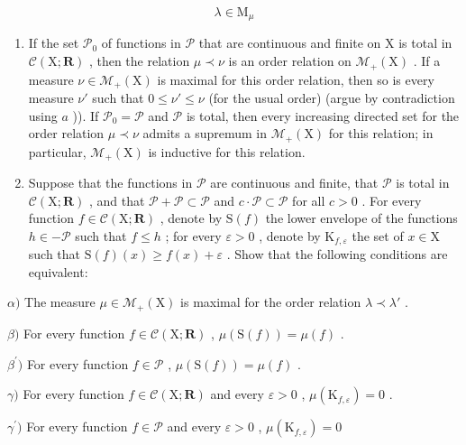 \[
\lambda \in \mathrm{M} _ {\mu}
\]

\begin{enumerate}
\def\labelenumi{\alph{enumi})}
\setcounter{enumi}{2}
\item
  If the set \(\mathcal{P}_0\) of functions in \(\mathcal{P}\) that are continuous and finite on X is total in \(\mathcal{C}(\mathrm{X};\mathbf{R})\) , then the relation \(\mu \prec \nu\) is an order relation on \(\mathcal{M}_{+}(\mathrm{X})\) . If a measure \(\nu \in \mathcal{M}_{+}(\mathrm{X})\) is maximal for this order relation, then so is every measure \(\nu'\) such that \(0 \leqslant \nu' \leqslant \nu\) (for the usual order) (argue by contradiction using \(a\) )). If \(\mathcal{P}_0 = \mathcal{P}\) and \(\mathcal{P}\) is total, then every increasing directed set for the order relation \(\mu \prec \nu\) admits a supremum in \(\mathcal{M}_{+}(\mathrm{X})\) for this relation; in particular, \(\mathcal{M}_{+}(\mathrm{X})\) is inductive for this relation.
\item
  Suppose that the functions in \(\mathcal{P}\) are continuous and finite, that \(\mathcal{P}\) is total in \(\mathcal{C}(\mathrm{X};\mathbf{R})\) , and that \(\mathcal{P} + \mathcal{P} \subset \mathcal{P}\) and \(c \cdot \mathcal{P} \subset \mathcal{P}\) for all \(c > 0\) . For every function \(f \in \mathcal{C}(\mathrm{X};\mathbf{R})\) , denote by \(\mathrm{S}(f)\) the lower envelope of the functions \(h \in -\mathcal{P}\) such that \(f \leqslant h\) ; for every \(\varepsilon > 0\) , denote by \(\mathrm{K}_{f,\varepsilon}\) the set of \(x \in \mathrm{X}\) such that \(\mathrm{S}(f)(x) \geqslant f(x) + \varepsilon\) . Show that the following conditions are equivalent:
\end{enumerate}

\(\alpha)\) The measure \(\mu \in \mathcal{M}_{+}(\mathrm{X})\) is maximal for the order relation \(\lambda \prec \lambda'\) .

\(\beta)\) For every function \(f \in \mathcal{C}(\mathrm{X}; \mathbf{R})\) , \(\mu(\mathrm{S}(f)) = \mu(f)\) .

\(\beta^{\prime})\) For every function \(f \in \mathcal{P}\) , \(\mu(\mathrm{S}(f)) = \mu(f)\) .

\(\gamma)\) For every function \(f \in \mathcal{C}(\mathrm{X}; \mathbf{R})\) and every \(\varepsilon > 0\) , \(\mu(\mathrm{K}_{f,\varepsilon}) = 0\) .

\(\gamma^{\prime})\) For every function \(f\in \mathcal{P}\) and every \(\varepsilon >0\) , \(\mu (\mathrm{K}_{f,\varepsilon}) = 0\)

